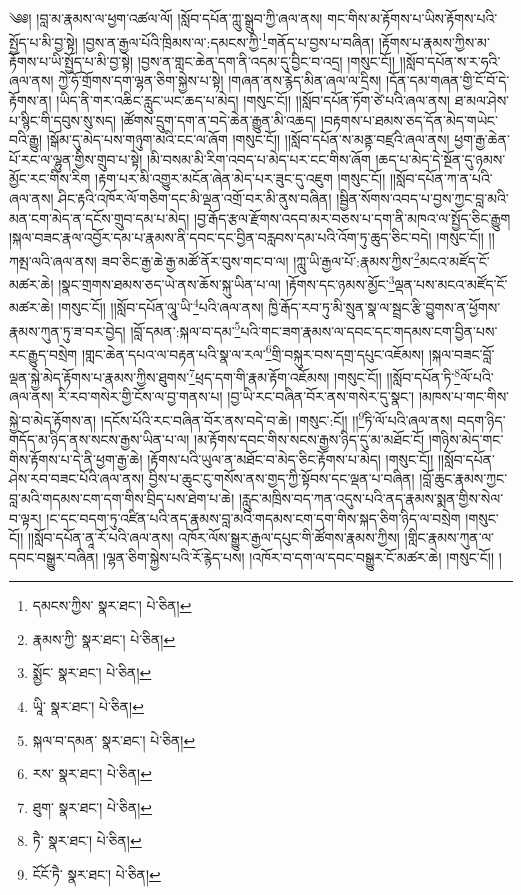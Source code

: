 \setcounter{footnote}{0} 
༄༅། །བླ་མ་རྣམས་ལ་ཕྱག་འཚལ་ལོ། །སློབ་དཔོན་ཀླུ་སྒྲུབ་ཀྱི་ཞལ་ནས། གང་གིས་མ་རྟོགས་པ་ཡིས་རྟོགས་པའི་སྤྱོད་པ་མི་བྱ་སྟེ། །བྱས་ན་རྒྱལ་པོའི་ཁྲིམས་ལ་:དམངས་ཀྱི་\footnote{དམངས་ཀྱིས་  སྣར་ཐང་།  པེ་ཅིན། }གནོད་པ་བྱས་པ་བཞིན། །རྟོགས་པ་རྣམས་ཀྱིས་མ་རྟོགས་པ་ཡི་སྤྱོད་པ་མི་བྱ་སྟེ། །བྱས་ན་གླང་ཆེན་དག་ནི་འདམ་དུ་བྱིང་བ་འདྲ། །གསུང་ངོ།། །།སློབ་དཔོན་ས་ར་ཧའི་ཞལ་ནས། ཀྱེ་ཧོ་གྲོགས་དག་ལྷན་ཅིག་སྐྱེས་པ་སྟེ། །གཞན་ནས་རྙེད་མིན་ཞལ་ལ་དྲིས། །དོན་དམ་གཞན་གྱི་ངོ་བོ་དེ་རྟོགས་ན། །ཡིད་ནི་གར་འཆིང་རླུང་ཡང་ཆད་པ་མེད། །གསུང་ངོ།། །།སློབ་དཔོན་ཏོག་ཙེ་པའི་ཞལ་ནས། ཐ་མལ་ཤེས་པ་སྙིང་གི་དབུས་སུ་སད། །ཚོགས་དྲུག་དག་ན་བདེ་ཆེན་རྒྱུན་མི་འཆད། །བརྟགས་པ་ཐམས་ཅད་དོན་མེད་གཡེང་བའི་རྒྱུ། །སྒོམ་དུ་མེད་པས་གཉུག་མའི་ངང་ལ་ཞོག །གསུང་ངོ།། །།སློབ་དཔོན་ས་མནྟ་བཛྲའི་ཞལ་ནས། ཕྱག་རྒྱ་ཆེན་པོ་རང་ལ་ལྷུན་གྱིས་གྲུབ་པ་སྟེ། །མི་བསམ་མི་རིག་འབད་པ་མེད་པར་ངང་གིས་ཞོག །ཆད་པ་མེད་དེ་སྔོན་དུ་ཉམས་མྱོང་རང་གིས་རིག །རྟག་པར་མི་འགྱུར་མངོན་ཞེན་མེད་པར་ཟུང་དུ་འཇུག །གསུང་ངོ།། །།སློབ་དཔོན་ཀ་ན་པའི་ཞལ་ནས། ཤིང་རྟའི་འཁོར་ལོ་གཅིག་དང་མི་ལྡན་འགྲོ་བར་མི་ནུས་བཞིན། །སྦྱིན་སོགས་འབད་པ་བྱས་ཀྱང་བླ་མའི་མན་ངག་མེད་ན་དངོས་གྲུབ་དམ་པ་མེད། །བྱ་རྒོད་རྩལ་རྫོགས་འདབ་མར་བཅས་པ་དག་ནི་མཁའ་ལ་སྤྱོད་ཅིང་རྒྱུག །སྐལ་བཟང་རྣལ་འབྱོར་དམ་པ་རྣམས་ནི་དབང་དང་བྱིན་བརླབས་དམ་པའི་འོག་ཏུ་ཆུད་ཅིང་བདེ། །གསུང་ངོ།། །།ཀམྤ་ལའི་ཞལ་ནས། ཟབ་ཅིང་རྒྱ་ཆེ་རྒྱ་མཚོ་ནོར་བུས་གང་བ་ལ། །ཀླུ་ཡི་རྒྱལ་པོ་:རྣམས་ཀྱིས་\footnote{རྣམས་ཀྱི་  སྣར་ཐང་།  པེ་ཅིན། }མངའ་མཛོད་ངོ་མཚར་ཆེ། །སྣང་གྲགས་ཐམས་ཅད་ཡེ་ནས་ཆོས་སྐུ་ཡིན་པ་ལ། །རྟོགས་དང་ཉམས་མྱོང་\footnote{སྨྱོང་  སྣར་ཐང་།  པེ་ཅིན། }ལྡན་པས་མངའ་མཛོད་ངོ་མཚར་ཆེ། །གསུང་ངོ།། །།སློབ་དཔོན་ལཱུ་ཡི་\footnote{ཡཱི་  སྣར་ཐང་།  པེ་ཅིན། }པའི་ཞལ་ནས། ཁྱི་རྒོད་རབ་ཏུ་མི་སྲུན་སྣ་ལ་སྦྲང་རྩི་བྱུགས་ན་ཕྱོགས་རྣམས་ཀུན་ཏུ་ཟ་བར་བྱེད། །བློ་དམན་:སྐལ་བ་དམ་\footnote{སྐལ་བ་དམན་  སྣར་ཐང་།  པེ་ཅིན། }པའི་གང་ཟག་རྣམས་ལ་དབང་དང་གདམས་ངག་བྱིན་པས་རང་རྒྱུད་བསྲེག །གླང་ཆེན་དཔའ་ལ་བརྟན་པའི་སྣ་ལ་རལ་\footnote{རས་  སྣར་ཐང་།  པེ་ཅིན། }གྲི་བསྐུར་བས་དགྲ་དཔུང་འཇོམས། །སྐལ་བཟང་བློ་ལྡན་སྐྱེ་མེད་རྟོགས་པ་རྣམས་ཀྱིས་ཐུགས་\footnote{ཐུག་  སྣར་ཐང་།  པེ་ཅིན། }ཕྲད་དག་གི་རྣམ་རྟོག་འཇོམས། །གསུང་ངོ།། །།སློབ་དཔོན་ཏི་\footnote{ཏཻ་  སྣར་ཐང་།  པེ་ཅིན། }ལོ་པའི་ཞལ་ནས། རི་རབ་གསེར་གྱི་ངོས་ལ་བྱ་གནས་པ། །བྱ་ཡི་རང་བཞིན་བོར་ནས་གསེར་དུ་སྣང་། །མཁས་པ་གང་གིས་སྐྱེ་བ་མེད་རྟོགས་ན། །དངོས་པོའི་རང་བཞིན་བོར་ནས་བདེ་བ་ཆེ། །གསུང་:ངོ།། །།\footnote{ངོངོ་ཏཻ་  སྣར་ཐང་།  པེ་ཅིན། }ཏི་ལོ་པའི་ཞལ་ནས། བདག་ཉིད་གདོད་མ་ཉིད་ནས་སངས་རྒྱས་ཡིན་པ་ལ། །མ་རྟོགས་དབང་གིས་སངས་རྒྱས་ཉིད་དུ་མ་མཐོང་ངོ། །གཉིས་མེད་གང་གིས་རྟོགས་པ་དེ་ནི་ཕྱག་རྒྱ་ཆེ། །རྟོགས་པའི་ཡུལ་ན་མཐོང་བ་མེད་ཅིང་རྟོགས་པ་མེད། །གསུང་ངོ།། །།སློབ་དཔོན་ཤེས་རབ་བཟང་པོའི་ཞལ་ནས། བྱིས་པ་ཆུང་ངུ་གསོས་ནས་གྱད་ཀྱི་སྟོབས་དང་ལྡན་པ་བཞིན། །བློ་ཆུང་རྣམས་ཀྱང་བླ་མའི་གདམས་ངག་དག་གིས་བྲིད་པས་ཐེག་པ་ཆེ། །རླུང་མཁྲིས་བད་ཀན་འདུས་པའི་ནད་རྣམས་སྨན་གྱིས་སེལ་བ་ལྟར། །ང་དང་བདག་ཏུ་འཛིན་པའི་ནད་རྣམས་བླ་མའི་གདམས་ངག་དག་གིས་སྐད་ཅིག་ཉིད་ལ་བསྲེག །གསུང་ངོ།། །།སློབ་དཔོན་ནཱ་རོ་པའི་ཞལ་ནས། འཁོར་ལོས་སྒྱུར་རྒྱལ་དཔུང་གི་ཚོགས་རྣམས་ཀྱིས། །གླིང་རྣམས་ཀུན་ལ་དབང་བསྒྱུར་བཞིན། །ལྷན་ཅིག་སྐྱེས་པའི་རོ་རྙེད་པས། །འཁོར་བ་དག་ལ་དབང་བསྒྱུར་ངོ་མཚར་ཆེ། །གསུང་ངོ།། །
